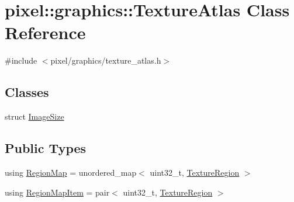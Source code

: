\hypertarget{classpixel_1_1graphics_1_1_texture_atlas}{}\section{pixel\+:\+:graphics\+:\+:Texture\+Atlas Class Reference}
\label{classpixel_1_1graphics_1_1_texture_atlas}


{\ttfamily \#include $<$pixel/graphics/texture\+\_\+atlas.\+h$>$}

\subsection*{Classes}
\begin{DoxyCompactItemize}
\item 
struct \hyperlink{structpixel_1_1graphics_1_1_texture_atlas_1_1_image_size}{Image\+Size}
\end{DoxyCompactItemize}
\subsection*{Public Types}
\begin{DoxyCompactItemize}
\item 
using \hyperlink{classpixel_1_1graphics_1_1_texture_atlas_adcb359d1961bd99f8eeb35f456df1e0c}{Region\+Map} = unordered\+\_\+map$<$ uint32\+\_\+t, \hyperlink{structpixel_1_1graphics_1_1_texture_region}{Texture\+Region} $>$
\item 
using \hyperlink{classpixel_1_1graphics_1_1_texture_atlas_a0bc1372e4dd1c78eeeba84caf3485e11}{Region\+Map\+Item} = pair$<$ uint32\+\_\+t, \hyperlink{structpixel_1_1graphics_1_1_texture_region}{Texture\+Region} $>$
\end{DoxyCompactItemize}
